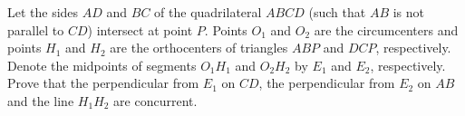 Let the sides $AD$ and $BC$ of the quadrilateral $ABCD$ (such that $AB$ is not parallel to $CD$) intersect at point $P$. Points $O_1$ and $O_2$ are the circumcenters and points $H_1$ and $H_2$ are the orthocenters of triangles $ABP$ and $DCP$, respectively. Denote the midpoints of segments $O_1 H_1$ and $O_2 H_2$ by $E_1$ and $E_2$, respectively. Prove that the perpendicular from $E_1$ on $CD$, the perpendicular from $E_2$ on $AB$ and the line $H_1 H_2$ are concurrent.
